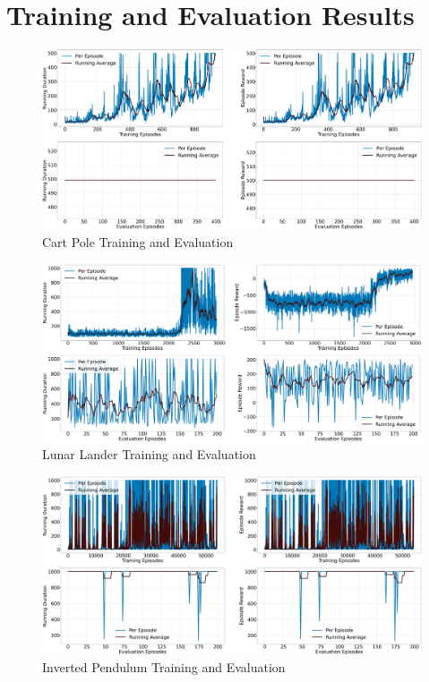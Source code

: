 \documentclass{article} %
\begin{document}
\section{Training and Evaluation Results}

\begin{figure}[H]
    \begin{center}
        \includegraphics[width=\textwidth]{qac_cartpole.png}
    \end{center}
    \caption{Cart Pole Training and Evaluation}
\end{figure}

\begin{figure}[H]
    \begin{center}
        \includegraphics[width=\textwidth]{qac_lunar.png}
    \end{center}
    \caption{Lunar Lander Training and Evaluation}
\end{figure}

\begin{figure}[H]
    \begin{center}
        \includegraphics[width=\textwidth]{qac_invpendulum.png}
    \end{center}
    \caption{Inverted Pendulum Training and Evaluation}
\end{figure}

\printbibliography
\end{document}

